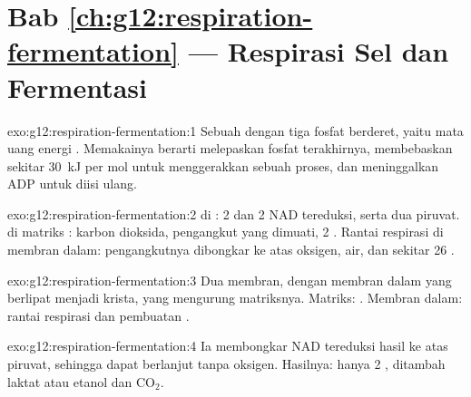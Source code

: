 \section*{Bab \ref{ch:g12:respiration-fermentation} --- Respirasi Sel dan Fermentasi}

\begin{solution}{exo:g12:respiration-fermentation:1}
Sebuah  dengan tiga fosfat berderet, yaitu mata uang energi
. Memakainya berarti melepaskan fosfat terakhirnya, membebaskan
sekitar \qty{30}{kJ} per mol untuk menggerakkan sebuah proses, dan
meninggalkan ADP untuk diisi ulang.
\end{solution}

\begin{solution}{exo:g12:respiration-fermentation:2}
 di : 2  dan 2 NAD tereduksi, serta dua piruvat.
 di matriks : karbon dioksida, pengangkut yang
dimuati, 2 . Rantai respirasi di membran dalam: pengangkutnya
dibongkar ke atas oksigen, air, dan sekitar 26 .
\end{solution}

\begin{solution}{exo:g12:respiration-fermentation:3}
Dua membran, dengan membran dalam yang berlipat menjadi krista, yang
mengurung matriksnya. Matriks: . Membran dalam: rantai
respirasi dan pembuatan .
\end{solution}

\begin{solution}{exo:g12:respiration-fermentation:4}
Ia membongkar NAD tereduksi hasil  ke atas piruvat, sehingga
 dapat berlanjut tanpa oksigen. Hasilnya: hanya 2 
, ditambah laktat atau etanol dan $\mathrm{CO_2}$.
\end{solution}

